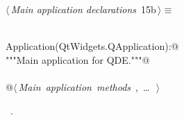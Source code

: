 \documentclass[
    a4paper,      %
    10pt,         %
    openright,    %
    notitlepage,  %
    parskip=half, %
]{scrreprt}       %
\theoremstyle{definition}                    %
\begin{document}
\begin{flushleft} \small
\begin{minipage}{\linewidth}\label{scrap2}\raggedright\small
{} $\langle\,${\itshape Main application declarations}\nobreak\ {\footnotesize {15b}}$\,\rangle\equiv$
\vspace{-1ex}
\begin{list}{}{} \item
\mbox{}\lstinline@@\\
\mbox{}\lstinline@class Application(QtWidgets.QApplication):@\\
\mbox{}\lstinline@    """Main application for QDE."""@\\
\mbox{}\lstinline@@\\
\mbox{}\lstinline@    @\hbox{$\langle\,${\itshape Main application methods}\nobreak\ {\footnotesize {}, \ldots\ }$\,\rangle$}\lstinline@@\\
\mbox{}\lstinline@@{\NWsep}
\end{list}
\vspace{-1.5ex}
\footnotesize
\begin{list}{}{\setlength{\itemsep}{-\parsep}\setlength{\itemindent}{-\leftmargin}}
\item \NWtxtMacroRefIn\ .

\item{}
\end{list}
\end{minipage}\vspace{4ex}
\end{flushleft}
\end{document}
